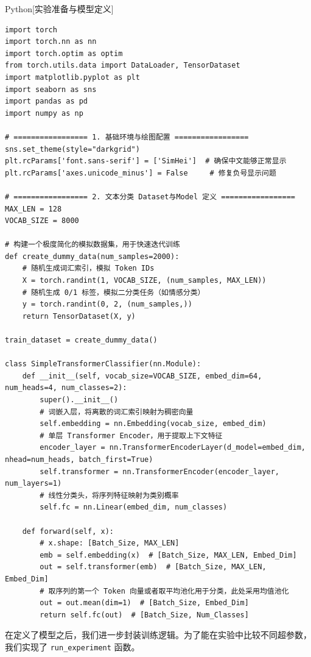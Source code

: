 \documentclass[10pt]{article}
\numberwithin{equation}{section}
\theoremstyle{plain}
\theoremstyle{definition}
\theoremstyle{remark}
\begin{document}
\begin{CodeBox}{Python}[实验准备与模型定义]
\begin{lstlisting}[style=PythonStyle]
import torch
import torch.nn as nn
import torch.optim as optim
from torch.utils.data import DataLoader, TensorDataset
import matplotlib.pyplot as plt
import seaborn as sns
import pandas as pd
import numpy as np

# ================= 1. 基础环境与绘图配置 =================
sns.set_theme(style="darkgrid")
plt.rcParams['font.sans-serif'] = ['SimHei']  # 确保中文能够正常显示
plt.rcParams['axes.unicode_minus'] = False     # 修复负号显示问题

# ================= 2. 文本分类 Dataset与Model 定义 =================
MAX_LEN = 128
VOCAB_SIZE = 8000

# 构建一个极度简化的模拟数据集，用于快速迭代训练
def create_dummy_data(num_samples=2000):
    # 随机生成词汇索引，模拟 Token IDs
    X = torch.randint(1, VOCAB_SIZE, (num_samples, MAX_LEN))
    # 随机生成 0/1 标签，模拟二分类任务（如情感分类）
    y = torch.randint(0, 2, (num_samples,))
    return TensorDataset(X, y)

train_dataset = create_dummy_data()

class SimpleTransformerClassifier(nn.Module):
    def __init__(self, vocab_size=VOCAB_SIZE, embed_dim=64, num_heads=4, num_classes=2):
        super().__init__()
        # 词嵌入层，将离散的词汇索引映射为稠密向量
        self.embedding = nn.Embedding(vocab_size, embed_dim)
        # 单层 Transformer Encoder，用于提取上下文特征
        encoder_layer = nn.TransformerEncoderLayer(d_model=embed_dim, nhead=num_heads, batch_first=True)
        self.transformer = nn.TransformerEncoder(encoder_layer, num_layers=1)
        # 线性分类头，将序列特征映射为类别概率
        self.fc = nn.Linear(embed_dim, num_classes)

    def forward(self, x):
        # x.shape: [Batch_Size, MAX_LEN]
        emb = self.embedding(x)  # [Batch_Size, MAX_LEN, Embed_Dim]
        out = self.transformer(emb)  # [Batch_Size, MAX_LEN, Embed_Dim]
        # 取序列的第一个 Token 向量或者取平均池化用于分类，此处采用均值池化
        out = out.mean(dim=1)  # [Batch_Size, Embed_Dim]
        return self.fc(out)  # [Batch_Size, Num_Classes]
\end{lstlisting}
\end{CodeBox}

在定义了模型之后，我们进一步封装训练逻辑。为了能在实验中比较不同超参数，我们实现了 \texttt{run\_experiment} 函数。
\end{document}
